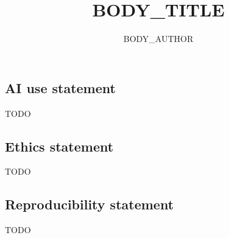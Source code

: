 \documentclass{article} %
\title{BODY_TITLE}
\author{BODY_AUTHOR}
\theoremstyle{definition}
\theoremstyle{remark}
\theoremstyle{plain}
\begin{document}
\maketitle



\subsection*{AI use statement}

TODO

\subsection*{Ethics statement}

TODO

\subsection*{Reproducibility statement}

TODO





\appendix

\end{document}
